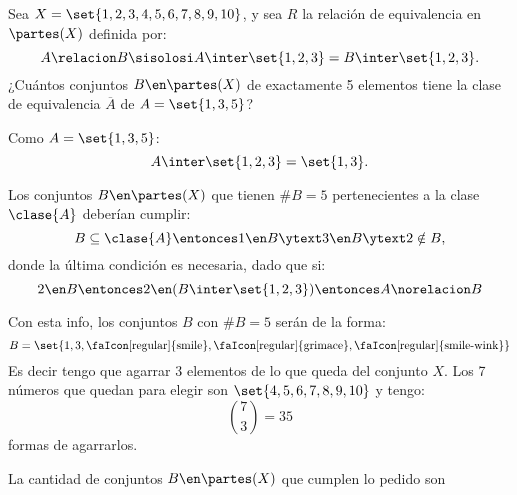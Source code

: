 \begin{enunciado}{\ejercicio}
  Sea $X = \set{1,2,3,4,5,6,7,8,9,10}$, y sea $R$ la relación de equivalencia en $\partes(X)$ definida por:
  $$
    A \relacion B \sisolosi A \inter \set{1,2,3} = B \inter \set{1,2,3}.
  $$
  ¿Cuántos conjuntos $B \en \partes(X)$ de exactamente 5 elementos tiene la clase de equivalencia $\overline A $ de $A = \set{1,3,5}$?
\end{enunciado}

Como $A = \set{1,3,5}$:
$$
  A \inter \set{1,2,3} = \set{1,3}.
$$

Los conjuntos $B \en \partes(X)$ que tienen $\#B = 5$ pertenecientes a la clase $\clase{A}$
deberían cumplir:
$$
  B \subseteq \clase{A}
  \entonces
  1 \en B
  \ytext
  3 \en B
  \ytext
  2 \notin B,
$$
donde la última condición es necesaria, dado que si:
$$
  2 \en B
  \entonces
  2 \en (B \inter \set{1,2,3})
  \entonces
  A \norelacion B
$$

Con esta info, los conjuntos $B$ con $\#B = 5$ serán de la forma:
$$
  B = \set{ 1, 3, \text{\faIcon[regular]{smile}}, \text{\faIcon[regular]{grimace}}, \text{\faIcon[regular]{smile-wink}} }
$$
Es decir tengo que agarrar 3 elementos de lo que queda del conjunto $X$.
Los 7 números que quedan para elegir son $\set{4,5,6,7,8,9,10}$ y tengo:
$$
  \binom{7}{3} = 35
$$
formas de agarrarlos.

La cantidad de conjuntos $B \en \partes(X)$ que cumplen lo pedido son 

\begin{aportes}
  \item {}
\end{aportes}
